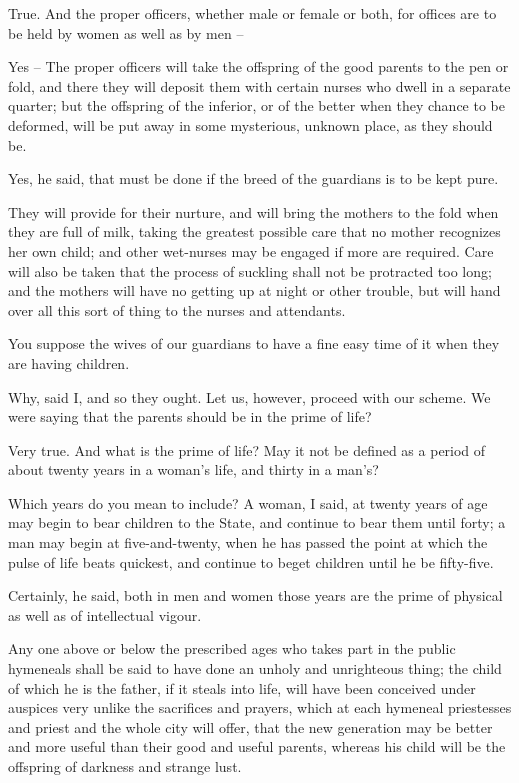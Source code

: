 True.
And the proper officers, whether male or female or both, for offices are to be held by women as well as by men --

Yes --
The proper officers will take the offspring of the good parents to the pen or fold, and there they will deposit them with certain nurses who dwell in a separate quarter; but the offspring of the inferior, or of the better when they chance to be deformed, will be put away in some mysterious, unknown place, as they should be.

Yes, he said, that must be done if the breed of the guardians is to be kept pure.

They will provide for their nurture, and will bring the mothers to the fold when they are full of milk, taking the greatest possible care that no mother recognizes her own child; and other wet-nurses may be engaged if more are required. Care will also be taken that the process of suckling shall not be protracted too long; and the mothers will have no getting up at night or other trouble, but will hand over all this sort of thing to the nurses and attendants.

You suppose the wives of our guardians to have a fine easy time of it when they are having children.

Why, said I, and so they ought. Let us, however, proceed with our scheme. We were saying that the parents should be in the prime of life?

Very true.
And what is the prime of life? May it not be defined as a period of about twenty years in a woman's life, and thirty in a man's?

Which years do you mean to include?
A woman, I said, at twenty years of age may begin to bear children to the State, and continue to bear them until forty; a man may begin at five-and-twenty, when he has passed the point at which the pulse of life beats quickest, and continue to beget children until he be fifty-five.

Certainly, he said, both in men and women those years are the prime of physical as well as of intellectual vigour.

Any one above or below the prescribed ages who takes part in the public hymeneals shall be said to have done an unholy and unrighteous thing; the child of which he is the father, if it steals into life, will have been conceived under auspices very unlike the sacrifices and prayers, which at each hymeneal priestesses and priest and the whole city will offer, that the new generation may be better and more useful than their good and useful parents, whereas his child will be the offspring of darkness and strange lust.

